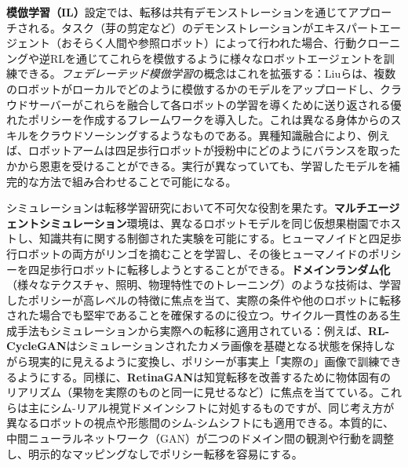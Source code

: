 \documentclass[a4paper,fleqn,10pt,twocolumn]{template_v1.0}
\begin{document}
\textbf{模倣学習（IL）}設定では、転移は共有デモンストレーションを通じてアプローチされる。タスク（芽の剪定など）のデモンストレーションがエキスパートエージェント（おそらく人間や参照ロボット）によって行われた場合、行動クローニングや逆RLを通じてこれらを模倣するように様々なロボットエージェントを訓練できる。\textit{フェデレーテッド模倣学習}の概念はこれを拡張する：Liuらは、複数のロボットがローカルでどのように模倣するかのモデルをアップロードし、クラウドサーバーがこれらを融合して各ロボットの学習を導くために送り返される優れたポリシーを作成するフレームワークを導入した\cite{Liu2020}。これは異なる身体からのスキルをクラウドソーシングするようなものである。異種知識融合により、例えば、ロボットアームは四足歩行ロボットが授粉中にどのようにバランスを取ったかから恩恵を受けることができる。実行が異なっていても、学習したモデルを補完的な方法で組み合わせることで可能になる\cite{Liu2020}。

シミュレーションは転移学習研究において不可欠な役割を果たす。\textbf{マルチエージェントシミュレーション}環境は、異なるロボットモデルを同じ仮想果樹園でホストし、知識共有に関する制御された実験を可能にする。ヒューマノイドと四足歩行ロボットの両方がリンゴを摘むことを学習し、その後ヒューマノイドのポリシーを四足歩行ロボットに転移しようとすることができる。\textbf{ドメインランダム化}（様々なテクスチャ、照明、物理特性でのトレーニング）のような技術は、学習したポリシーが高レベルの特徴に焦点を当て、実際の条件や他のロボットに転移された場合でも堅牢であることを確保するのに役立つ\cite{Zhu2024}\cite{Zhu2024b}。サイクル一貫性のある生成手法もシミュレーションから実際への転移に適用されている：例えば、\textbf{RL-CycleGAN}はシミュレーションされたカメラ画像を基礎となる状態を保持しながら現実的に見えるように変換し、ポリシーが事実上「実際の」画像で訓練できるようにする\cite{Rao2020}。同様に、\textbf{RetinaGAN}は知覚転移を改善するために物体固有のリアリズム（果物を実際のものと同一に見せるなど）に焦点を当てている\cite{Ho2021}。これらは主にシム-リアル視覚ドメインシフトに対処するものですが、同じ考え方が異なるロボットの視点や形態間のシム-シムシフトにも適用できる。本質的に、中間ニューラルネットワーク（GAN）が二つのドメイン間の観測や行動を調整し、明示的なマッピングなしでポリシー転移を容易にする。
\end{document}
